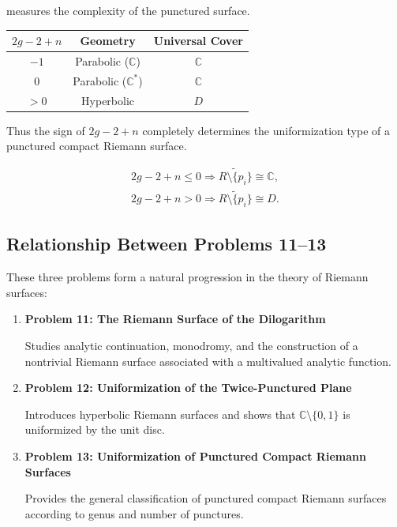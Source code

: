 \documentclass[12pt,a4paper]{article}
\theoremstyle{notespace}
\begin{document}
measures the complexity of the punctured surface.

\begin{center}
	\begin{tabular}{|c|c|c|}
		\hline
		\(2g-2+n\) &
		Geometry &
		Universal Cover
		\\
		\hline
		
		\(-1\) &
		Parabolic (\(\mathbb C\))
		&
		\(\mathbb C\)
		\\
		\hline
		
		\(0\) &
		Parabolic (\(\mathbb C^*\))
		&
		\(\mathbb C\)
		\\
		\hline
		
		\(>0\) &
		Hyperbolic
		&
		\(D\)
		\\
		\hline
		
	\end{tabular}
\end{center}

\bigskip

Thus the sign of \(2g-2+n\) completely determines the uniformization type of a punctured compact Riemann surface.

\[
\boxed{
	\begin{array}{c}
		2g-2+n\le 0
		\Longrightarrow
		\widetilde{R\setminus\{p_i\}}
		\cong \mathbb C,
		\\[6pt]
		2g-2+n>0
		\Longrightarrow
		\widetilde{R\setminus\{p_i\}}
		\cong D.
	\end{array}
}
\]

\bigskip

\subsection{Relationship Between Problems 11--13}

These three problems form a natural progression in the theory of Riemann surfaces:

\begin{enumerate}
	\item \textbf{Problem 11: The Riemann Surface of the Dilogarithm}
	
	Studies analytic continuation, monodromy, and the construction of a nontrivial Riemann surface associated with a multivalued analytic function.
	
	\item \textbf{Problem 12: Uniformization of the Twice-Punctured Plane}
	
	Introduces hyperbolic Riemann surfaces and shows that
	\(\mathbb C\setminus\{0,1\}\)
	is uniformized by the unit disc.
	
	\item \textbf{Problem 13: Uniformization of Punctured Compact Riemann Surfaces}
	
	Provides the general classification of punctured compact Riemann surfaces according to genus and number of punctures.
\end{enumerate}
\end{document}
